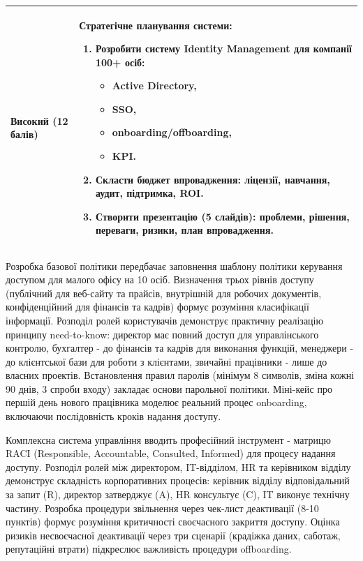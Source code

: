 \begin{table}[h!]
\begin{tabular}{
  | >{\raggedright\arraybackslash}p{} 
  | >{\raggedright\arraybackslash}p{} |
}
\cellcolor{TableBodyPeach}
\textbf{Високий} (12 балів) &
\textbf{Стратегічне планування системи:}
\begin{enumerate}
    \item Розробити систему Identity Management для компанії 100+ осіб:
    \begin{itemize}
        \item Active Directory,\vspace{-0.5em}
        \item SSO,\vspace{-0.5em}
        \item onboarding/offboarding,\vspace{-0.5em}
        \item KPI.
    \end{itemize}
    \item Скласти бюджет впровадження: ліцензії, навчання, аудит, підтримка, ROI.
    \item Створити презентацію (5 слайдів): проблеми, рішення, переваги, ризики, план впровадження.
\end{enumerate} \\ \hline

\end{tabular}
\end{table}

Розробка базової політики передбачає заповнення шаблону політики керування доступом для малого офісу на 10 осіб. Визначення трьох рівнів доступу (публічний для веб-сайту та прайсів, внутрішній для робочих документів, конфіденційний для фінансів та кадрів) формує розуміння класифікації інформації.
Розподіл ролей користувачів демонструє практичну реалізацію принципу need-to-know: директор має повний доступ для управлінського контролю, бухгалтер - до фінансів та кадрів для виконання функцій, менеджери - до клієнтської бази для роботи з клієнтами, звичайні працівники - лише до власних проектів.
Встановлення правил паролів (мінімум 8 символів, зміна кожні 90 днів, 3 спроби входу) закладає основи парольної політики. Міні-кейс про першій день нового працівника моделює реальний процес onboarding, включаючи послідовність кроків надання доступу.

Комплексна система управління вводить професійний інструмент - матрицю RACI (Responsible, Accountable, Consulted, Informed) для процесу надання доступу. Розподіл ролей між директором, IT-відділом, HR та керівником відділу демонструє складність корпоративних процесів: керівник відділу відповідальний за запит (R), директор затверджує (A), HR консультує (C), IT виконує технічну частину.
Розробка процедури звільнення через чек-лист деактивації (8-10 пунктів) формує розуміння критичності своєчасного закриття доступу. Оцінка ризиків несвоєчасної деактивації через три сценарії (крадіжка даних, саботаж, репутаційні втрати) підкреслює важливість процедури offboarding.

